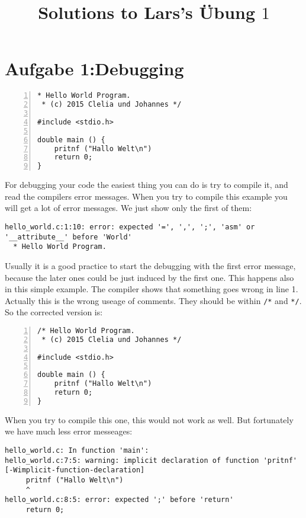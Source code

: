 \documentclass{article}[12pt]
\title{Solutions to Lars's Übung $1$}
\newenvironment{codelisting}{\fontfamily{pcr}\selectfont%
\lstset{commentstyle=\textit}\lstset{language=c}}{\fontfamily{ptm}\selectfont}
\begin{document}
\maketitle
\section{Aufgabe 1:Debugging}
\begin{codelisting}
\begin{lstlisting}[numbers=left,numberstyle=\tiny,frame=tlrb,showstringspaces=false]
 * Hello World Program.
 * (c) 2015 Clelia und Johannes */

#include <stdio.h>

double main () {
    pritnf ("Hallo Welt\n")
    return 0;
}
\end{lstlisting}
\end{codelisting}
For debugging your code the easiest thing you can do is try to compile it, and read the compilers error messages.
When you try to compile this example you will get a lot of error messages. We just show only the first of them:
\begin{lstlisting}
hello_world.c:1:10: error: expected '=', ',', ';', 'asm' or '__attribute__' before 'World'
  * Hello World Program.
\end{lstlisting}
Usually it is a good practice to start the debugging with the first error message, because the later ones could be 
just induced by the first one. This happens also in this simple example. The compiler shows that something goes wrong 
in line 1. Actually this is the wrong useage of comments. They should be within \texttt{/*} and \texttt{*/}. So the corrected
version is:
\begin{codelisting}
\begin{lstlisting}[numbers=left,numberstyle=\tiny,frame=tlrb,showstringspaces=false]
/* Hello World Program.
 * (c) 2015 Clelia und Johannes */

#include <stdio.h>

double main () {
    pritnf ("Hallo Welt\n")
    return 0;
}
\end{lstlisting}
\end{codelisting}
When you try to compile this one, this would not work as well. But fortunately we have much less error messeages:
\begin{lstlisting}
hello_world.c: In function 'main':
hello_world.c:7:5: warning: implicit declaration of function 'pritnf' [-Wimplicit-function-declaration]
     pritnf ("Hallo Welt\n")
     ^
hello_world.c:8:5: error: expected ';' before 'return'
     return 0;
\end{lstlisting}
\end{document}
